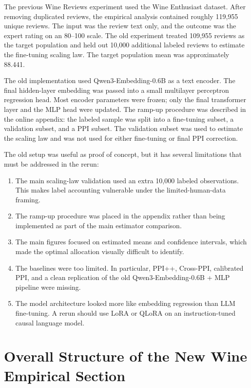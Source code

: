\documentclass[11pt]{article}
\begin{document}
The previous Wine Reviews experiment used the Wine Enthusiast dataset. After removing duplicated reviews, the empirical analysis contained roughly 119,955 unique reviews. The input was the review text only, and the outcome was the expert rating on an 80--100 scale. The old experiment treated 109,955 reviews as the target population and held out 10,000 additional labeled reviews to estimate the fine-tuning scaling law. The target population mean was approximately 88.441.

The old implementation used Qwen3-Embedding-0.6B as a text encoder. The final hidden-layer embedding was passed into a small multilayer perceptron regression head. Most encoder parameters were frozen; only the final transformer layer and the MLP head were updated. The ramp-up procedure was described in the online appendix: the labeled sample was split into a fine-tuning subset, a validation subset, and a PPI subset. The validation subset was used to estimate the scaling law and was not used for either fine-tuning or final PPI correction.

The old setup was useful as proof of concept, but it has several limitations that must be addressed in the rerun:

\begin{enumerate}[label=(\alph*)]
    \item The main scaling-law validation used an extra 10,000 labeled observations. This makes label accounting vulnerable under the limited-human-data framing.
    \item The ramp-up procedure was placed in the appendix rather than being implemented as part of the main estimator comparison.
    \item The main figures focused on estimated means and confidence intervals, which made the optimal allocation visually difficult to identify.
    \item The baselines were too limited. In particular, PPI++, Cross-PPI, calibrated PPI, and a clean replication of the old Qwen3-Embedding-0.6B + MLP pipeline were missing.
    \item The model architecture looked more like embedding regression than LLM fine-tuning. A rerun should use LoRA or QLoRA on an instruction-tuned causal language model.
\end{enumerate}

\section{Overall Structure of the New Wine Empirical Section}
\end{document}
